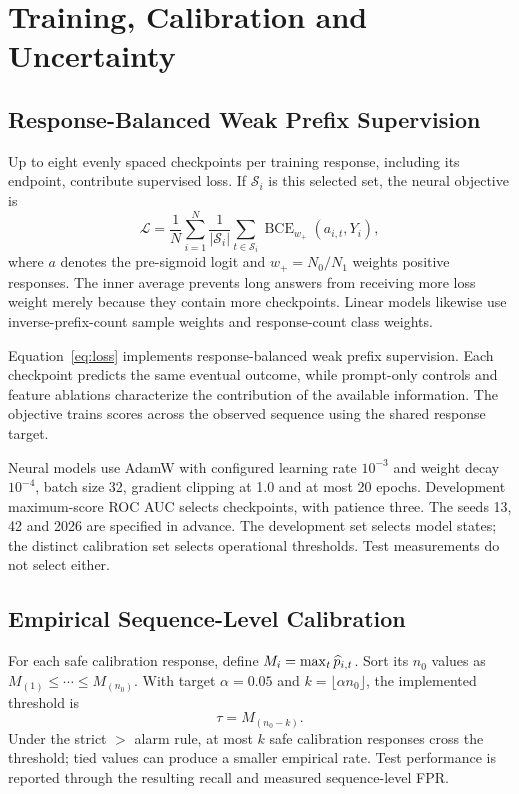 \section{Training, Calibration and Uncertainty}\label{sec:protocol}
\subsection{Response-Balanced Weak Prefix Supervision}
Up to eight evenly spaced checkpoints per training response, including its endpoint, contribute supervised loss. If $\mathcal S_i$ is this selected set, the neural objective is
\begin{equation}
 \mathcal L=\frac{1}{N}\sum_{i=1}^N\frac{1}{|\mathcal S_i|}
 \sum_{t\in\mathcal S_i}\operatorname{BCE}_{w_+}(a_{i,t},Y_i),
 \label{eq:loss}
\end{equation}
where $a$ denotes the pre-sigmoid logit and $w_+=N_0/N_1$ weights positive responses. The inner average prevents long answers from receiving more loss weight merely because they contain more checkpoints. Linear models likewise use inverse-prefix-count sample weights and response-count class weights.

Equation~\ref{eq:loss} implements response-balanced weak prefix supervision. Each checkpoint predicts the same eventual outcome, while prompt-only controls and feature ablations characterize the contribution of the available information. The objective trains scores across the observed sequence using the shared response target.

Neural models use AdamW with configured learning rate $10^{-3}$ and weight decay $10^{-4}$, batch size 32, gradient clipping at 1.0 and at most 20 epochs. Development maximum-score ROC AUC selects checkpoints, with patience three. The seeds 13, 42 and 2026 are specified in advance. The development set selects model states; the distinct calibration set selects operational thresholds. Test measurements do not select either.

\subsection{Empirical Sequence-Level Calibration}
For each safe calibration response, define $M_i=\max_t\widehat p_{i,t}$. Sort its $n_0$ values as $M_{(1)}\leq\cdots\leq M_{(n_0)}$. With target $\alpha=0.05$ and $k=\lfloor\alpha n_0\rfloor$, the implemented threshold is
\begin{equation*}
 \tau=M_{(n_0-k)}.
\end{equation*}
Under the strict $>$ alarm rule, at most $k$ safe calibration responses cross the threshold; tied values can produce a smaller empirical rate. Test performance is reported through the resulting recall and measured sequence-level FPR.

